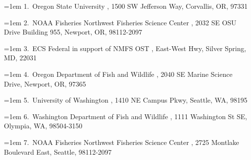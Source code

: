 \documentclass[
]{scrartcl}
\begin{document}
\begin{titlepage}
\begin{minipage}[b][\textheight][s]{\textwidth}

  \vspace{2\baselineskip}

  \hangindent=1em
  {1}.~{Oregon State University}%
  , %
  {1500 SW Jefferson Way, Corvallis, OR, 97331}%
  \par\hangindent=1em%
  {2}.~{NOAA Fisheries Northwest Fisheries Science Center}%
  , %
  {2032 SE OSU Drive Building 955, Newport, OR, 98112-2097}%
  \par\hangindent=1em%
  {3}.~{ECS Federal in support of NMFS OST}%
  , %
  {East-West Hwy, Silver Spring, MD, 22031}%
  \par\hangindent=1em%
  {4}.~{Oregon Department of Fish and Wildlife}%
  , %
  {2040 SE Marine Science Drive, Newport, OR, 97365}%
  \par\hangindent=1em%
  {5}.~{University of Washington}%
  , %
  {1410 NE Campus Pkwy, Seattle, WA, 98195}%
  \par\hangindent=1em%
  {6}.~{Washington Department of Fish and Wildlife}%
  , %
  {1111 Washington St SE, Olympia, WA, 98504-3150}%
  \par\hangindent=1em%
  {7}.~{NOAA Fisheries Northwest Fisheries Science Center}%
  , %
  {2725 Montlake Boulevard East, Seattle, 98112-2097}%


  \vspace{1\baselineskip}



  \vfill


  \vspace{1\baselineskip}


\end{minipage}
\end{titlepage}
\end{document}
